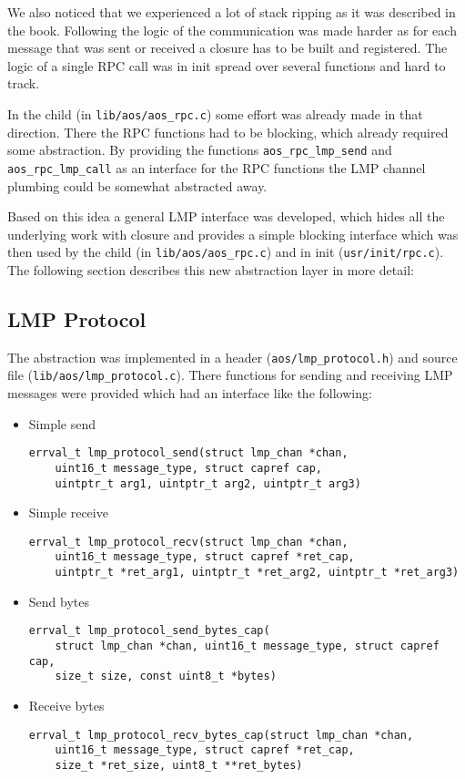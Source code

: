 We also noticed that we experienced a lot of stack ripping as it was described in the book. Following the logic of the communication was made harder as for each message that was sent or received a closure has to be built and registered. The logic of a single RPC call was in init spread over several functions and hard to track.

In the child (in \verb|lib/aos/aos_rpc.c|) some effort was already made in that direction. There the RPC functions had to be blocking, which already required some abstraction. By providing the functions \verb|aos_rpc_lmp_send| and \verb|aos_rpc_lmp_call| as an interface for the RPC functions the LMP channel plumbing could be somewhat abstracted away.

Based on this idea a general LMP interface was developed, which hides all the underlying work with closure and provides a simple blocking interface which was then used by the child (in \verb|lib/aos/aos_rpc.c|) and in init (\verb|usr/init/rpc.c|). The following section describes this new abstraction layer in more detail:

\subsection{LMP Protocol}

The abstraction was implemented in a header (\verb|aos/lmp_protocol.h|) and source file (\verb|lib/aos/lmp_protocol.c|). There functions for sending and receiving LMP messages were provided which had an interface like the following:
\begin{itemize}
    \item Simple send
    \begin{verbatim}errval_t lmp_protocol_send(struct lmp_chan *chan,
    uint16_t message_type, struct capref cap,
    uintptr_t arg1, uintptr_t arg2, uintptr_t arg3)\end{verbatim}
    \item Simple receive
    \begin{verbatim}errval_t lmp_protocol_recv(struct lmp_chan *chan,
    uint16_t message_type, struct capref *ret_cap,
    uintptr_t *ret_arg1, uintptr_t *ret_arg2, uintptr_t *ret_arg3)\end{verbatim}
    \item Send bytes
    \begin{verbatim}errval_t lmp_protocol_send_bytes_cap(
    struct lmp_chan *chan, uint16_t message_type, struct capref cap,
    size_t size, const uint8_t *bytes)\end{verbatim}
    \item Receive bytes
    \begin{verbatim}errval_t lmp_protocol_recv_bytes_cap(struct lmp_chan *chan,
    uint16_t message_type, struct capref *ret_cap,
    size_t *ret_size, uint8_t **ret_bytes)\end{verbatim}
\end{itemize}

